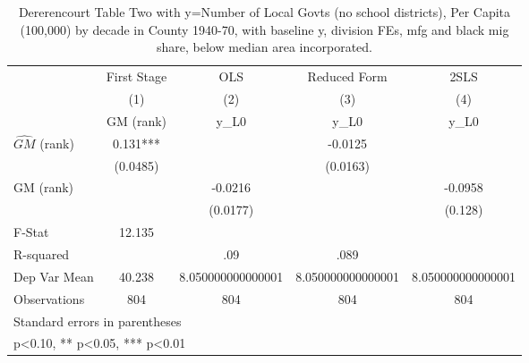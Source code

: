 \begin{table}[htbp]\centering
\def\sym#1{\ifmmode^{#1}\else\(^{#1}\)\fi}
\caption{Dererencourt Table Two with y=Number of Local Govts (no school districts), Per Capita (100,000) by decade in County 1940-70, with baseline y, division FEs, mfg and black mig share, below median area incorporated.}
\begin{tabular}{l*{4}{c}}
\toprule
                    & First Stage   &         OLS   &Reduced Form   &        2SLS   \\
                    &\multicolumn{1}{c}{(1)}&\multicolumn{1}{c}{(2)}&\multicolumn{1}{c}{(3)}&\multicolumn{1}{c}{(4)}\\
                    &\multicolumn{1}{c}{GM  (rank)}&\multicolumn{1}{c}{y\_L0}&\multicolumn{1}{c}{y\_L0}&\multicolumn{1}{c}{y\_L0}\\
\midrule
$\hat{GM}$ (rank)   &       0.131***&               &     -0.0125   &               \\
                    &    (0.0485)   &               &    (0.0163)   &               \\
\addlinespace
GM  (rank)          &               &     -0.0216   &               &     -0.0958   \\
                    &               &    (0.0177)   &               &     (0.128)   \\
\midrule
F-Stat              &      12.135   &               &               &               \\
R-squared           &               &         .09   &        .089   &               \\
Dep Var Mean        &      40.238   &8.050000000000001   &8.050000000000001   &8.050000000000001   \\
Observations        &         804   &         804   &         804   &         804   \\
\bottomrule
\multicolumn{5}{l}{\footnotesize Standard errors in parentheses}\\
\multicolumn{5}{l}{\footnotesize * p<0.10, ** p<0.05, *** p<0.01}\\
\end{tabular}
\end{table}
